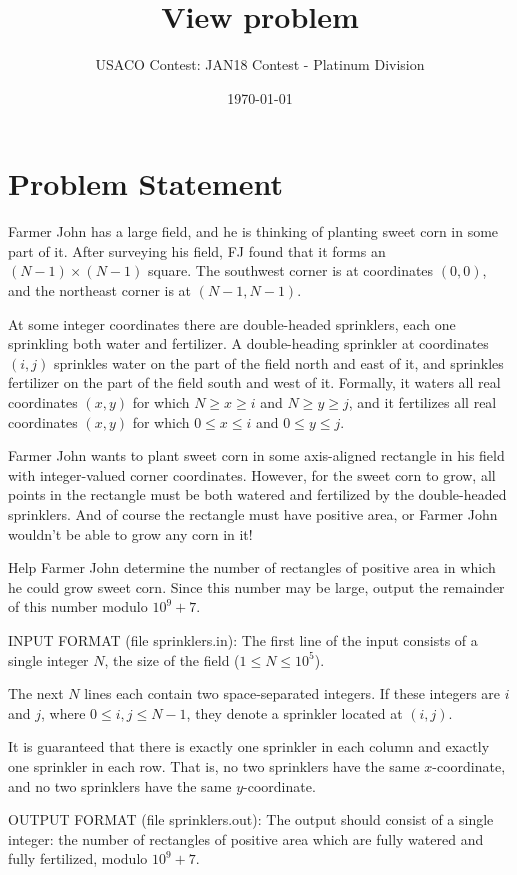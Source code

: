 \documentclass[12pt]{article}
\title{View problem}
\author{USACO Contest: JAN18 Contest - Platinum Division}
\date{\today}
\begin{document}
\maketitle

\section*{Problem Statement}

Farmer John has a large field, and he is thinking of planting sweet corn in some
part of it. After surveying his field, FJ found that it forms an
$(N-1) \times (N-1)$ square. The southwest corner is at coordinates $(0,0)$, and
the northeast corner is at $(N-1,N-1)$.

At some integer coordinates there are double-headed sprinklers, each one
sprinkling both water and fertilizer. A double-heading sprinkler at coordinates
$(i,j)$  sprinkles water on the part of the field north and east of it, and
sprinkles fertilizer on the part of the field south and west of it. Formally, it
waters all real coordinates $(x,y)$ for which $N \geq x \geq i$ and
$N \geq y \geq j$, and it fertilizes all real coordinates $(x,y)$ for which
$0 \leq x \leq i$ and $0 \leq y \leq j$.

Farmer John wants to plant sweet corn in some axis-aligned rectangle in his
field with integer-valued corner coordinates. However, for the sweet corn to
grow, all points in the rectangle must be both watered and fertilized by the
double-headed sprinklers. And of course the rectangle must have positive area,
or Farmer John wouldn't be able to grow any corn in it!

Help Farmer John determine the number of rectangles of positive area in which he
could grow sweet corn. Since this number may be large, output the remainder of
this number modulo
$10^9 + 7$.

INPUT FORMAT (file sprinklers.in):
The first line of the input consists of a single integer $N$, the size of the
field ($1 \leq N \leq 10^5$).

The next $N$ lines each contain two space-separated integers. If these integers
are $i$ and $j$, where $0 \leq i,j \leq N-1$, they denote a sprinkler located at
$(i,j)$.

It is guaranteed that there is exactly one sprinkler in each column and exactly
one sprinkler in each row. That is, no two sprinklers have the same
$x$-coordinate, and no two sprinklers have the same $y$-coordinate.


OUTPUT FORMAT (file sprinklers.out):
The output should consist of a single integer: the number of rectangles of
positive area which are fully watered and fully fertilized, modulo $10^9 + 7$.
\end{document}
